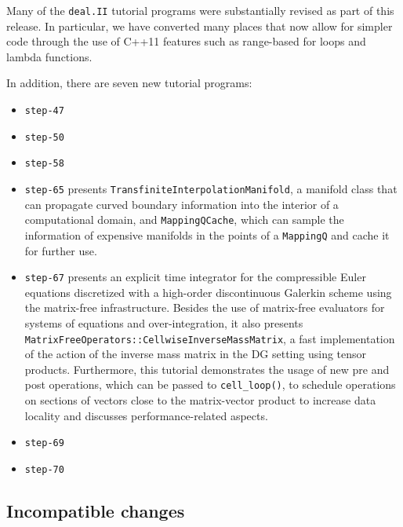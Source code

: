 \documentclass{ansarticle-preprint}
\newcommand{\specialword}[1]{\texttt{#1}}
\newcommand{\dealii}{{\specialword{deal.II}}\xspace}
\begin{document}
Many of the \dealii{} tutorial programs were substantially revised as
part of this release. In particular, we have converted many places
that now allow for simpler code through the use of C++11 features such
as range-based for loops and lambda functions.

In addition, there are seven new tutorial programs:
\begin{itemize}
\item \texttt{step-47}
\item \texttt{step-50}
\item \texttt{step-58}
\item \texttt{step-65} presents \texttt{TransfiniteInterpolationManifold}, a
manifold class that can propagate curved boundary information into the
interior of a computational domain, and \texttt{MappingQCache}, which can sample 
the information of expensive manifolds in the points of a \texttt{MappingQ} and 
cache it for further use.
\item \texttt{step-67} presents an explicit time integrator for the
compressible Euler equations discretized with a high-order discontinuous
Galerkin scheme using the matrix-free infrastructure. Besides the use of
matrix-free evaluators for systems of equations and over-integration, it also
presents \texttt{MatrixFreeOperators::CellwiseInverseMassMatrix}, a fast implementation
of the action of the inverse mass matrix in the DG setting using tensor
products. Furthermore, this tutorial demonstrates the usage of new 
pre and post operations, which can be passed to \texttt{cell\_loop()}, to schedule operations on sections of vectors close 
to the matrix-vector product to increase data locality 
and discusses performance-related aspects.
\item \texttt{step-69}
\item \texttt{step-70}
\end{itemize}


\subsection{Incompatible changes}
\end{document}

